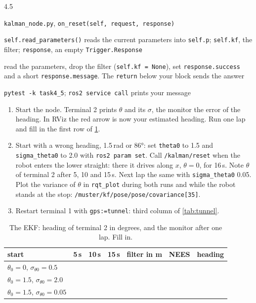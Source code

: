 \documentclass[11pt,a4paper,parskip=half]{scrartcl}
\newcommand{\thema}[1]{\texttt{#1}}
\newcommand{\datei}[1]{\texttt{#1}}
\newcommand{\todorow}[2]{\par\noindent\raggedright\hangindent=1.6cm\hangafter=1\makebox[1.6cm][l]{\color{ohmgrey}#1}#2\par}
\newcommand{\where}[1]{\todorow{where}{#1}}
\newcommand{\given}[1]{\todorow{given}{#1}}
\newcommand{\result}[1]{\todorow{write}{#1}}
\newcommand{\test}[1]{\todorow{test}{#1}}
\begin{document}
\begin{todo}{4.5}
\where{\datei{kalman\_node.py}, \thema{on\_reset(self, request, response)}}
\given{\thema{self.read\_parameters()} reads the current parameters into \thema{self.p}; \thema{self.kf}, the
       filter; \thema{response}, an empty \thema{Trigger.Response}}
\result{read the parameters, drop the filter (\thema{self.kf = None}), set \thema{response.success} and a
       short \thema{response.message}. The \thema{return} below your block sends the answer}
\test{\thema{pytest -k task4\_5}; \thema{ros2 service call} prints your message}
\end{todo}

\begin{enumerate}
  \item Start the node. Terminal 2 prints \(\theta\) and its \(\sigma\), the monitor the error of the heading.
        In RViz the red arrow is now your estimated heading. Run one lap and fill in the first row of
        \cref{tab:theta}.
  \item Start with a wrong heading, 1.5\,rad or 86°: set \thema{theta0} to 1.5 and \thema{sigma\_theta0} to
        2.0 with \thema{ros2 param set}. Call \thema{/kalman/reset} when the robot enters the lower straight:
        there it drives along \(x\), \(\theta = 0\), for 16\,s. Note \(\theta\) of terminal 2 after 5, 10 and
        15\,s. Next lap the same with \thema{sigma\_theta0} 0.05. Plot the variance of \(\theta\) in \thema{rqt\_plot}
        during both runs and while the robot stands at the stop: \thema{/muster/kf/pose/pose/covariance[35]}.
  \item Restart terminal 1 with \thema{gps:=tunnel}: third column of \cref{tab:tunnel}.
\end{enumerate}

\begin{table}[ht]\centering
\renewcommand{\arraystretch}{1.4}
\caption{The EKF: heading of terminal 2 in degrees, and the monitor after one lap. Fill in.}
\label{tab:theta}
\begin{tabular}{@{}p{4.4cm}p{1.4cm}p{1.4cm}p{1.4cm}p{1.6cm}p{1.2cm}p{1.6cm}@{}}
\toprule
start & 5\,s & 10\,s & 15\,s & filter in m & NEES & heading \\
\midrule
\(\theta_0 = 0\), \(\sigma_{\theta 0} = 0.5\) & & & & & & \\
\(\theta_0 = 1.5\), \(\sigma_{\theta 0} = 2.0\) & & & & & & \\
\(\theta_0 = 1.5\), \(\sigma_{\theta 0} = 0.05\) & & & & & & \\
\bottomrule
\end{tabular}
\end{table}
\end{document}
